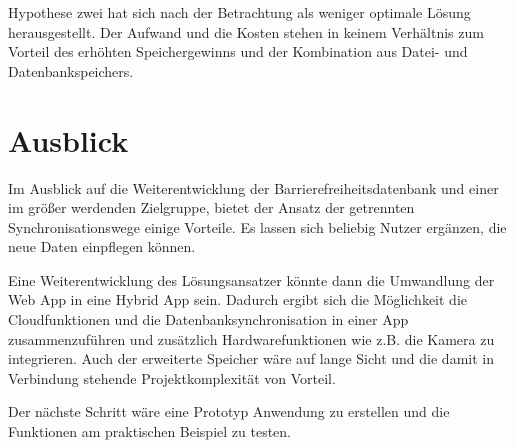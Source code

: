 Hypothese zwei hat sich nach der Betrachtung als weniger optimale Lösung herausgestellt. Der Aufwand und die Kosten stehen in keinem Verhältnis zum Vorteil des erhöhten Speichergewinns und der Kombination aus Datei- und Datenbankspeichers.

\section{Ausblick}
\label{sec:Fazit:Ausblick}

Im Ausblick auf die Weiterentwicklung der Barrierefreiheitsdatenbank und einer im größer werdenden Zielgruppe, bietet der Ansatz der getrennten Synchronisationswege einige Vorteile. Es lassen sich beliebig Nutzer ergänzen, die neue Daten einpflegen können.

Eine Weiterentwicklung des Lösungsansatzer könnte dann die Umwandlung der Web App in eine Hybrid App sein. Dadurch ergibt sich die Möglichkeit die Cloudfunktionen und die Datenbanksynchronisation in einer App zusammenzuführen und zusätzlich Hardwarefunktionen wie z.B. die Kamera zu integrieren. Auch der erweiterte Speicher wäre auf lange Sicht und die damit in Verbindung stehende Projektkomplexität von Vorteil.

Der nächste Schritt wäre eine Prototyp Anwendung zu erstellen und die Funktionen am praktischen Beispiel zu testen.
